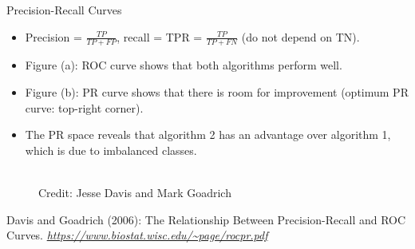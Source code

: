 \begin{vbframe}{Precision-Recall Curves}
\begin{footnotesize}
\begin{itemize}
  \item Precision = $\frac{TP}{TP + FP}$, recall = TPR = $\frac{TP}{TP + FN}$ (do not depend on TN).
  \item Figure (a): ROC curve shows that both algorithms perform well.
  \item Figure (b): PR curve shows that there is room for improvement (optimum PR curve: top-right corner).
  \item The PR space reveals that algorithm 2 has an advantage over algorithm 1, which is due to imbalanced classes.
\end{itemize}
\end{footnotesize}
\begin{figure}
    \centering
    \tiny{\\ Credit: Jesse Davis and Mark Goadrich \\}
\end{figure}
{\tiny{Davis and Goadrich (2006): The Relationship Between Precision-Recall and ROC Curves. \emph{\url{https://www.biostat.wisc.edu/~page/rocpr.pdf}}}\par}

\framebreak


\end{vbframe}
